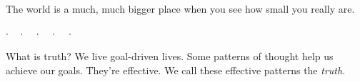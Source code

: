 \documentclass[11pt, oneside]{article}   	%
\newenvironment{answer}[1]
  {\renewcommand\theinnercustomthm{#1}\innercustomthm}
  {\endinnercustomthm}
\newcommand{\dotq}{\cdot\quad}
\newcommand{\scenebreak}{
    \medskip\centerline{$\dotq\dotq\dotq\dotq\cdot$}\medskip
}
\begin{document}
The world is a much, much bigger place when you see how small you really are.

\scenebreak

What is truth?
\begin{answer}{1}
    We live goal-driven lives.
    Some patterns of thought help us achieve our goals.
    They're effective.
    We call these effective patterns the {\em truth}.
\end{answer}
\end{document}
